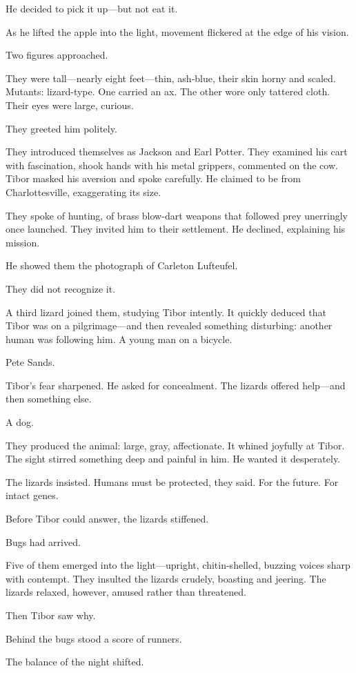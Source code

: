 He decided to pick it up—but not eat it.

As he lifted the apple into the light, movement flickered at the edge of his vision.

Two figures approached.

They were tall—nearly eight feet—thin, ash-blue, their skin horny and scaled. Mutants: lizard-type. One carried an ax. The other wore only tattered cloth. Their eyes were large, curious.

They greeted him politely.

They introduced themselves as Jackson and Earl Potter. They examined his cart with fascination, shook hands with his metal grippers, commented on the cow. Tibor masked his aversion and spoke carefully. He claimed to be from Charlottesville, exaggerating its size.

They spoke of hunting, of brass blow-dart weapons that followed prey unerringly once launched. They invited him to their settlement. He declined, explaining his mission.

He showed them the photograph of Carleton Lufteufel.

They did not recognize it.

A third lizard joined them, studying Tibor intently. It quickly deduced that Tibor was on a pilgrimage—and then revealed something disturbing: another human was following him. A young man on a bicycle.

Pete Sands.

Tibor’s fear sharpened. He asked for concealment. The lizards offered help—and then something else.

A dog.

They produced the animal: large, gray, affectionate. It whined joyfully at Tibor. The sight stirred something deep and painful in him. He wanted it desperately.

The lizards insisted. Humans must be protected, they said. For the future. For intact genes.

Before Tibor could answer, the lizards stiffened.

Bugs had arrived.

Five of them emerged into the light—upright, chitin-shelled, buzzing voices sharp with contempt. They insulted the lizards crudely, boasting and jeering. The lizards relaxed, however, amused rather than threatened.

Then Tibor saw why.

Behind the bugs stood a score of runners.

The balance of the night shifted.

